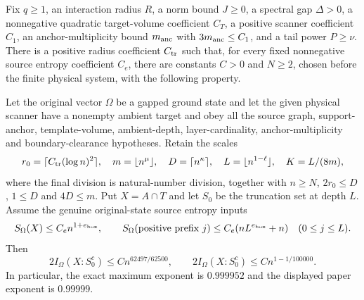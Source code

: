 \begin{lemma}
    \label{thm:source-final-information}
    \leanok
    Fix $q\geq1$, an interaction radius $R$, a norm bound $J\geq0$,
    a spectral gap $\Delta>0$, a nonnegative quadratic target-volume
    coefficient $C_T$, a positive scanner coefficient $C_1$, an
    anchor-multiplicity bound $m_{\rm anc}$ with $3m_{\rm anc}\leq C_1$,
    and a tail power $P\geq\nu$.
    There is a positive radius coefficient $C_{\rm tr}$ such that, for every
    fixed nonnegative source entropy coefficient $C_e$, there are constants
    $C>0$ and $N\geq2$, chosen before the finite physical system, with the
    following property.

    Let the original vector $\Omega$ be a gapped ground state and let the
    given physical scanner have a nonempty ambient target and obey
    all the source graph, support-anchor,
    template-volume, ambient-depth, layer-cardinality, anchor-multiplicity
    and boundary-clearance hypotheses.  Retain the scales
    \[
        r_0=\lceil C_{\rm tr}(\log n)^2\rceil,\quad
        m=\lfloor n^\mu\rfloor,\quad D=\lceil n^\kappa\rceil,\quad
        L=\lfloor n^{1-\ell}\rfloor,\quad K=L/(8m),
    \]
    where the final division is natural-number division, together with
    $n\geq N$, $2r_0\leq D$, $1\leq D$ and $4D\leq m$.
    Put $X=A\cap T$ and let $S_0$ be the truncation set at depth $L$.
    Assume the genuine original-state source entropy inputs
    \[
        S_\Omega(X)\leq C_e n^{1+e_{\rm box}},\qquad
        S_\Omega(\text{positive prefix }j)
        \leq C_e(nL^{e_{\rm box}}+n)\quad(0\leq j\leq L).
    \]
    Then
    \[
        2I_\Omega(X:S_0^c)\leq Cn^{62497/62500},\qquad
        2I_\Omega(X:S_0^c)\leq Cn^{1-1/100000}.
    \]
    In particular, the exact maximum exponent is $0.999952$ and the
    displayed paper exponent is $0.99999$.
\end{lemma}

